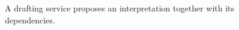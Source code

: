 \begin{figure}[H]
\centering
{}
\caption{A drafting service proposes an interpretation together with its dependencies.}\label{fig:teach-P-03-product-08}
\end{figure}
